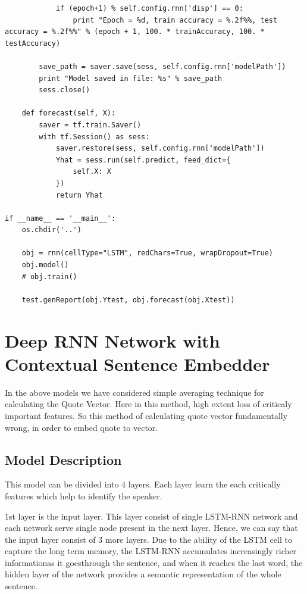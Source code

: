 \documentclass[BTech]{srmuthesis}
\begin{document}
\begin{verbatim}
            if (epoch+1) % self.config.rnn['disp'] == 0:
                print "Epoch = %d, train accuracy = %.2f%%, test accuracy = %.2f%%" % (epoch + 1, 100. * trainAccuracy, 100. * testAccuracy)

        save_path = saver.save(sess, self.config.rnn['modelPath'])
        print "Model saved in file: %s" % save_path
        sess.close()

    def forecast(self, X):
        saver = tf.train.Saver()
        with tf.Session() as sess:
            saver.restore(sess, self.config.rnn['modelPath'])
            Yhat = sess.run(self.predict, feed_dict={
                self.X: X
            })
            return Yhat

if __name__ == '__main__':
    os.chdir('..')

    obj = rnn(cellType="LSTM", redChars=True, wrapDropout=True)
    obj.model()
    # obj.train()

    test.genReport(obj.Ytest, obj.forecast(obj.Xtest))

\end{verbatim}


\chapter{Deep RNN Network with Contextual Sentence Embedder}

In the above models we have considered simple averaging technique for calculating the Quote Vector. Here in this method, high extent loss of criticaly important features.  So this method of calculating quote vector fundamentally wrong, in order to embed quote to vector. 

\section{Model Description}

This model can be divided into 4 layers. Each layer learn the each critically features which help to identify the speaker. 

1st layer is the input layer. This layer consist of single LSTM-RNN network and each network serve single node present in the next layer. Hence,  we can say that the input layer consist of 3 more layers. Due to the ability of the LSTM cell to capture the long term memory, the LSTM-RNN accumulates increasingly richer informationas it goesthrough the sentence, and when it reaches the last word, the hidden layer of the network provides a semantic representation of the whole sentence.
\end{document}
